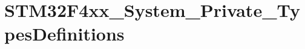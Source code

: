 \hypertarget{group___s_t_m32_f4xx___system___private___types_definitions}{\section{S\-T\-M32\-F4xx\-\_\-\-System\-\_\-\-Private\-\_\-\-Types\-Definitions}
\label{group___s_t_m32_f4xx___system___private___types_definitions}
}

